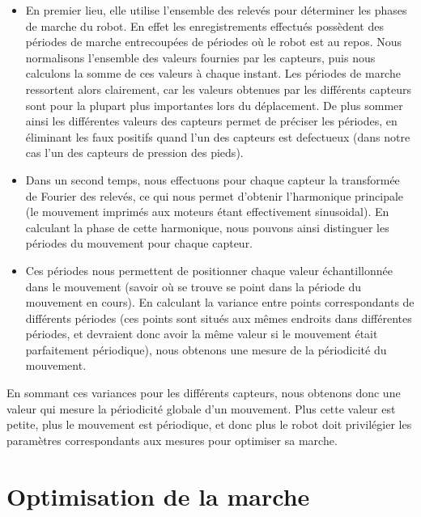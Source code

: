 \documentclass[11pt]{article}
\begin{document}
\begin{itemize}
\item En premier lieu, elle utilise l'ensemble des relevés pour déterminer les phases de marche du robot. En effet les enregistrements effectués possèdent des périodes de marche entrecoupées de périodes où le robot est au repos. Nous normalisons l'ensemble des valeurs fournies par les capteurs, puis nous calculons la somme de ces valeurs à chaque instant. Les périodes de marche ressortent alors clairement, car les valeurs obtenues par les différents capteurs sont pour la plupart plus importantes lors du déplacement. De plus sommer ainsi les différentes valeurs des capteurs permet de préciser les périodes, en éliminant les faux positifs quand l'un des capteurs est defectueux (dans notre cas l'un des capteurs de pression des pieds).
\item Dans un second temps, nous effectuons pour chaque capteur la transformée de Fourier des relevés, ce qui nous permet d'obtenir l'harmonique principale (le mouvement imprimés aux moteurs étant effectivement sinusoidal). En calculant la phase de cette harmonique, nous pouvons ainsi distinguer les périodes du mouvement pour chaque capteur.
\item Ces périodes nous permettent de positionner chaque valeur échantillonnée dans le mouvement (savoir où se trouve se point dans la période du mouvement en cours). En calculant la variance entre points correspondants de différents périodes (ces points sont situés aux mêmes endroits dans différentes périodes, et devraient donc avoir la même valeur si le mouvement était parfaitement périodique), nous obtenons une mesure de la périodicité du mouvement. 
\end{itemize}
En sommant ces variances pour les différents capteurs,
nous obtenons donc une valeur qui mesure la périodicité globale d'un mouvement. Plus cette valeur est petite, plus le mouvement est périodique, et donc plus le robot doit privilégier les paramètres correspondants aux mesures pour optimiser sa marche. 
\section{Optimisation de la marche}
\end{document}
